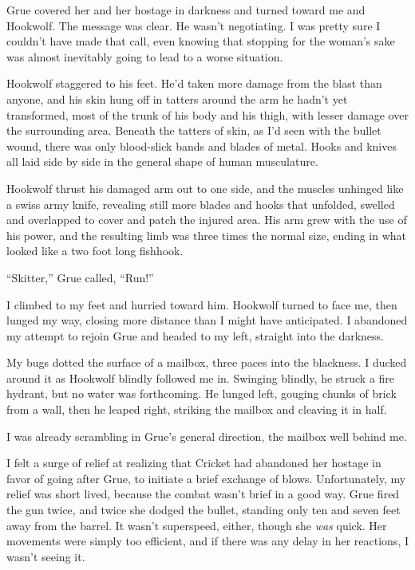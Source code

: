 Grue covered her and her hostage in darkness and turned toward me and Hookwolf.  The message was clear.  He wasn't negotiating.  I was pretty sure I couldn't have made that call, even knowing that stopping for the woman's sake was almost inevitably going to lead to a worse situation.



Hookwolf staggered to his feet.  He'd taken more damage from the blast than anyone, and his skin hung off in tatters around the arm he hadn't yet transformed, most of the trunk of his body and his thigh, with lesser damage over the surrounding area.  Beneath the tatters of skin, as I'd seen with the bullet wound, there was only blood-slick bands and blades of metal.  Hooks and knives all laid side by side in the general shape of human musculature.



Hookwolf thrust his damaged arm out to one side, and the muscles unhinged like a swiss army knife, revealing still more blades and hooks that unfolded, swelled and overlapped to cover and patch the injured area.  His arm grew with the use of his power, and the resulting limb was three times the normal size, ending in what looked like a two foot long fishhook.



``Skitter,'' Grue called, ``Run!''



I climbed to my feet and hurried toward him.  Hookwolf turned to face me, then lunged my way, closing more distance than I might have anticipated.   I abandoned my attempt to rejoin Grue and headed to my left, straight into the darkness.



My bugs dotted the surface of a mailbox, three paces into the blackness.  I ducked around it as Hookwolf blindly followed me in.  Swinging blindly, he struck a fire hydrant, but no water was forthcoming.  He lunged left, gouging chunks of brick from a wall, then he leaped right, striking the mailbox and cleaving it in half.



I was already scrambling in Grue's general direction, the mailbox well behind me.



I felt a surge of relief at realizing that Cricket had abandoned her hostage in favor of going after Grue, to initiate a brief exchange of blows.  Unfortunately, my relief was short lived, because the combat wasn't brief in a good way.  Grue fired the gun twice, and twice she dodged the bullet, standing only ten and seven feet away from the barrel.  It wasn't superspeed, either, though she \emph{was} quick.  Her movements were simply too efficient, and if there was any delay in her reactions, I wasn't seeing it.



